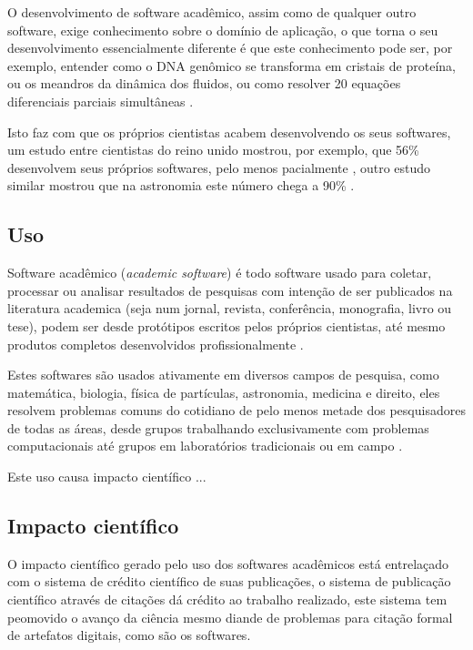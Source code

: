 O desenvolvimento de software acadêmico, assim como de qualquer outro
software, exige conhecimento sobre o domínio de aplicação, o que torna o
seu desenvolvimento essencialmente diferente é que este conhecimento pode ser,
por exemplo, entender como o DNA genômico se transforma em cristais de
proteína, ou os meandros da dinâmica dos fluidos, ou como resolver 20 equações
diferenciais parciais simultâneas \cite{segal2008developing}.

Isto faz com que os próprios cientistas acabem desenvolvendo os seus softwares,
um estudo entre cientistas do reino unido mostrou, por exemplo, que 56\%
desenvolvem seus próprios softwares, pelo menos pacialmente
\cite{hettrick_2014_14809}, outro estudo similar mostrou que na astronomia este
número chega a 90\% \cite{momcheva2015software}.

\subsection{Uso}


Software acadêmico ({\it academic software}) é todo software usado para
coletar, processar ou analisar resultados de pesquisas com intenção de ser
publicados na literatura academica (seja num jornal, revista, conferência,
monografia, livro ou tese), podem ser desde protótipos escritos pelos próprios
cientistas, até mesmo produtos completos desenvolvidos profissionalmente
\cite{allen2017engineering}.

Estes softwares são usados ativamente em diversos campos de pesquisa, como
matemática, biologia, física de partículas, astronomia, medicina e direito,
eles resolvem problemas comuns do cotidiano de pelo menos metade dos
pesquisadores de todas as áreas, desde grupos trabalhando exclusivamente com
problemas computacionais até grupos em laboratórios tradicionais ou em campo
\cite{wilson2014best}.

Este uso causa impacto científico ...

\subsection{Impacto científico}


O impacto científico gerado pelo uso dos softwares acadêmicos está
entrelaçado com o sistema de crédito científico de suas publicações,
o sistema de publicação científico através de citações dá crédito ao
trabalho realizado, este sistema tem peomovido o avanço da ciência
mesmo diande de problemas para citação formal de artefatos digitais,
como são os softwares.

